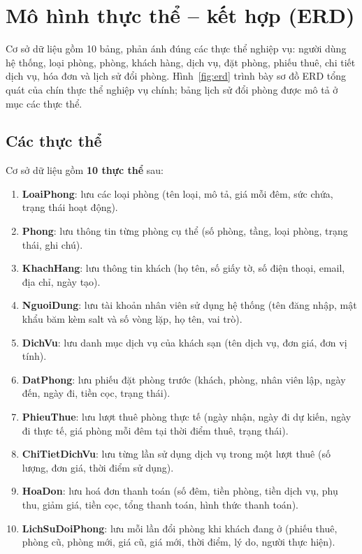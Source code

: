 \documentclass[14pt]{report}
\begin{document}
\section{Mô hình thực thể -- kết hợp (ERD)}

Cơ sở dữ liệu gồm 10 bảng, phản ánh đúng các thực thể nghiệp vụ: người dùng hệ thống, loại phòng, phòng, khách hàng, dịch vụ, đặt phòng, phiếu thuê, chi tiết dịch vụ, hóa đơn và lịch sử đổi phòng. Hình~\ref{fig:erd} trình bày sơ đồ ERD tổng quát của chín thực thể nghiệp vụ chính; bảng lịch sử đổi phòng được mô tả ở mục các thực thể.
\subsection{Các thực thể}

Cơ sở dữ liệu gồm \textbf{10 thực thể} sau:

\begin{enumerate}
  \item \textbf{LoaiPhong}: lưu các loại phòng (tên loại, mô tả, giá mỗi đêm, sức chứa, trạng thái hoạt động).
  \item \textbf{Phong}: lưu thông tin từng phòng cụ thể (số phòng, tầng, loại phòng, trạng thái, ghi chú).
  \item \textbf{KhachHang}: lưu thông tin khách (họ tên, số giấy tờ, số điện thoại, email, địa chỉ, ngày tạo).
  \item \textbf{NguoiDung}: lưu tài khoản nhân viên sử dụng hệ thống (tên đăng nhập, mật khẩu băm kèm salt và số vòng lặp, họ tên, vai trò).
  \item \textbf{DichVu}: lưu danh mục dịch vụ của khách sạn (tên dịch vụ, đơn giá, đơn vị tính).
  \item \textbf{DatPhong}: lưu phiếu đặt phòng trước (khách, phòng, nhân viên lập, ngày đến, ngày đi, tiền cọc, trạng thái).
  \item \textbf{PhieuThue}: lưu lượt thuê phòng thực tế (ngày nhận, ngày đi dự kiến, ngày đi thực tế, giá phòng mỗi đêm tại thời điểm thuê, trạng thái).
  \item \textbf{ChiTietDichVu}: lưu từng lần sử dụng dịch vụ trong một lượt thuê (số lượng, đơn giá, thời điểm sử dụng).
  \item \textbf{HoaDon}: lưu hoá đơn thanh toán (số đêm, tiền phòng, tiền dịch vụ, phụ thu, giảm giá, tiền cọc, tổng thanh toán, hình thức thanh toán).
  \item \textbf{LichSuDoiPhong}: lưu mỗi lần đổi phòng khi khách đang ở (phiếu thuê, phòng cũ, phòng mới, giá cũ, giá mới, thời điểm, lý do, người thực hiện).
\end{enumerate}
\end{document}
